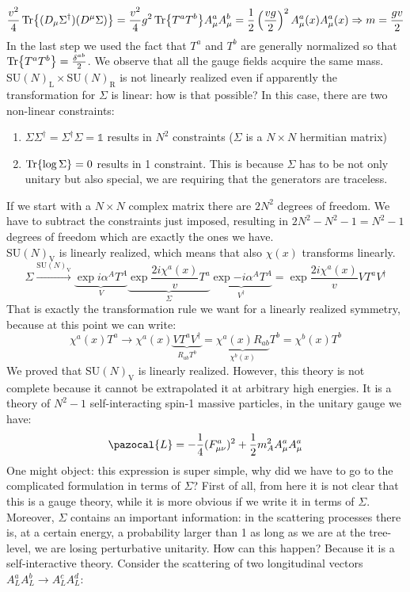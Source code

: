 \documentclass[../main.tex]{subfiles}
\begin{document}
\[
\frac{v^2}{4}\Tr{(D_\mu\Sigma^\dagger)(D^\mu\Sigma)}=\frac{v^2}{4}g^2\Tr{T^aT^b}A_\mu^aA_\mu^b=\frac{1}{2}\left(\frac{vg}{2}\right)^2A_\mu^a(x)A_\mu^a(x)\Rightarrow m=\frac{gv}{2}
\]
In the last step we used the fact that $T^a$ and $T^b$ are generally normalized so that $\Tr{T^aT^b}=\frac{\delta^{ab}}{2}$. We observe that all the gauge fields acquire the same mass.\\
SU$(N)_{\text{L}}\times$SU$(N)_{\text{R}}$ is not linearly realized even if apparently the transformation for $\Sigma$ is linear: how is that possible? In this case, there are two non-linear constraints:
\begin{enumerate}
    \item $\Sigma\Sigma^\dagger=\Sigma^\dagger\Sigma=\mathbb{1}$ results in $N^2$ constraints ($\Sigma$ is a $N\times N$ hermitian matrix)
    \item $\Tr{\log\Sigma}=0$ results in 1 constraint. This is because $\Sigma$ has to be not only unitary but also special, we are requiring that the generators are traceless.
\end{enumerate}
If we start with a $N\times N$ complex matrix there are $2N^2$ degrees of freedom. We have to subtract the constraints just imposed, resulting in $2N^2-N^2-1=N^2-1$ degrees of freedom which are exactly the ones we have.\\
SU$(N)_{\text{V}}$ is linearly realized, which means that also $\chi(x)$ transforms linearly.
\[
\Sigma\xrightarrow[]{\text{SU}(N)_{\text{V}}}\underbrace{\exp{i\alpha^AT^A}}_{V}\underbrace{\exp{\frac{2i\chi^a(x)}{v}T^a}}_{\Sigma}\underbrace{\exp{-i\alpha^AT^A}}_{V^\dagger}=\exp{\frac{2i\chi^a(x)}{v}VT^aV^\dagger}
\]
That is exactly the transformation rule we want for a linearly realized symmetry, because at this point we can write:
\[
\chi^a(x)T^a\to\chi^a(x)\underbrace{VT^aV^\dagger}_{R_{ab}T^b}=\underbrace{\chi^a(x)R_{ab}}_{\chi^b(x)}T^b=\chi^b(x)T^b
\]
We proved that SU$(N)_{\text{V}}$ is linearly realized. However, this theory is not complete because it cannot be extrapolated it at arbitrary high energies. It is a theory of $N^2-1$ self-interacting spin-1 massive particles, in the unitary gauge we have:
\[
\pazocal{L}=-\frac{1}{4}(F_{\mu\nu}^a)^2+\frac{1}{2}m_A^2A_\mu^aA_\mu^a
\]
One might object: this expression is super simple, why did we have to go to the complicated formulation in terms of $\Sigma$? First of all, from here it is not clear that this is a gauge theory, while it is more obvious if we write it in terms of $\Sigma$. Moreover, $\Sigma$ contains an important information: in the scattering processes there is, at a certain energy, a probability larger than 1 as long as we are at the tree-level, we are losing perturbative unitarity. How can this happen? Because it is a self-interactive theory. Consider the scattering of two longitudinal vectors $A_L^aA_L^b\to A_L^cA_L^d$: 
\end{document}
